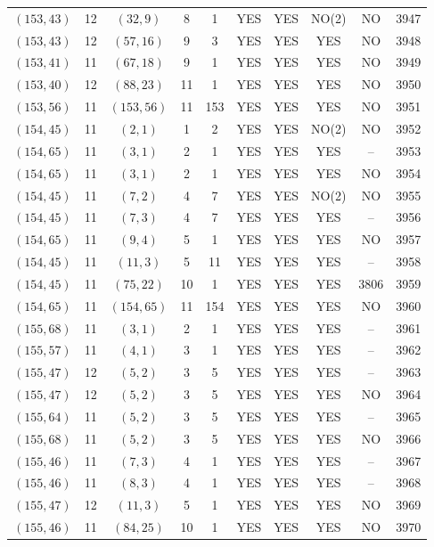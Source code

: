 \begin{longtable}{|c|c|c|c|c|c|c|c|c|c|}
$(153, 43)$ & 12 & $(32, 9)$ & 8 & 1 & YES & YES & NO(2) & NO & 3947\\
$(153, 43)$ & 12 & $(57, 16)$ & 9 & 3 & YES & YES & YES & NO & 3948\\
$(153, 41)$ & 11 & $(67, 18)$ & 9 & 1 & YES & YES & YES & NO & 3949\\
$(153, 40)$ & 12 & $(88, 23)$ & 11 & 1 & YES & YES & YES & NO & 3950\\
$(153, 56)$ & 11 & $(153, 56)$ & 11 & 153 & YES & YES & YES & NO & 3951\\
$(154, 45)$ & 11 & $(2, 1)$ & 1 & 2 & YES & YES & NO(2) & NO & 3952\\
$(154, 65)$ & 11 & $(3, 1)$ & 2 & 1 & YES & YES & YES & -- & 3953\\
$(154, 65)$ & 11 & $(3, 1)$ & 2 & 1 & YES & YES & YES & NO & 3954\\
$(154, 45)$ & 11 & $(7, 2)$ & 4 & 7 & YES & YES & NO(2) & NO & 3955\\
$(154, 45)$ & 11 & $(7, 3)$ & 4 & 7 & YES & YES & YES & -- & 3956\\
$(154, 65)$ & 11 & $(9, 4)$ & 5 & 1 & YES & YES & YES & NO & 3957\\
$(154, 45)$ & 11 & $(11, 3)$ & 5 & 11 & YES & YES & YES & -- & 3958\\
$(154, 45)$ & 11 & $(75, 22)$ & 10 & 1 & YES & YES & YES & 3806 & 3959\\
$(154, 65)$ & 11 & $(154, 65)$ & 11 & 154 & YES & YES & YES & NO & 3960\\
$(155, 68)$ & 11 & $(3, 1)$ & 2 & 1 & YES & YES & YES & -- & 3961\\
$(155, 57)$ & 11 & $(4, 1)$ & 3 & 1 & YES & YES & YES & -- & 3962\\
$(155, 47)$ & 12 & $(5, 2)$ & 3 & 5 & YES & YES & YES & -- & 3963\\
$(155, 47)$ & 12 & $(5, 2)$ & 3 & 5 & YES & YES & YES & NO & 3964\\
$(155, 64)$ & 11 & $(5, 2)$ & 3 & 5 & YES & YES & YES & -- & 3965\\
$(155, 68)$ & 11 & $(5, 2)$ & 3 & 5 & YES & YES & YES & NO & 3966\\
$(155, 46)$ & 11 & $(7, 3)$ & 4 & 1 & YES & YES & YES & -- & 3967\\
$(155, 46)$ & 11 & $(8, 3)$ & 4 & 1 & YES & YES & YES & -- & 3968\\
$(155, 47)$ & 12 & $(11, 3)$ & 5 & 1 & YES & YES & YES & NO & 3969\\
$(155, 46)$ & 11 & $(84, 25)$ & 10 & 1 & YES & YES & YES & NO & 3970\\

\end{longtable}
